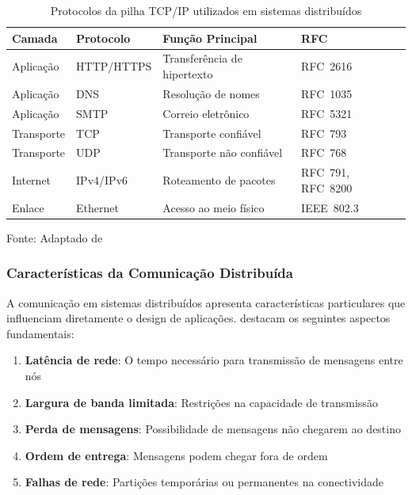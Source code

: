 \begin{table}[H]
\centering
\caption{Protocolos da pilha TCP/IP utilizados em sistemas distribuídos}
\begin{tabular}{|l|l|l|l|}
\hline
\textbf{Camada} & \textbf{Protocolo} & \textbf{Função Principal} & \textbf{RFC} \\
\hline
Aplicação & HTTP/HTTPS & Transferência de hipertexto & RFC~2616 \\
\hline
Aplicação & DNS & Resolução de nomes & RFC~1035 \\
\hline
Aplicação & SMTP & Correio eletrônico & RFC~5321 \\
\hline
Transporte & TCP & Transporte confiável & RFC~793 \\
\hline
Transporte & UDP & Transporte não confiável & RFC~768 \\
\hline
Internet & IPv4/IPv6 & Roteamento de pacotes & RFC~791, RFC~8200 \\
\hline
Enlace & Ethernet & Acesso ao meio físico & IEEE~802.3 \\
\hline
\end{tabular}

\label{tab:protocolos_tcpip}
{\fontsize{10pt}{\baselineskip}\selectfont
Fonte: Adaptado de }
\end{table}

\subsubsection{Características da Comunicação Distribuída}

A comunicação em sistemas distribuídos apresenta características particulares que influenciam diretamente o design de aplicações.  destacam os seguintes aspectos fundamentais:

\begin{enumerate}
    \item \textbf{Latência de rede}: O tempo necessário para transmissão de mensagens entre nós
    \item \textbf{Largura de banda limitada}: Restrições na capacidade de transmissão
    \item \textbf{Perda de mensagens}: Possibilidade de mensagens não chegarem ao destino
    \item \textbf{Ordem de entrega}: Mensagens podem chegar fora de ordem
    \item \textbf{Falhas de rede}: Partições temporárias ou permanentes na conectividade
\end{enumerate}

